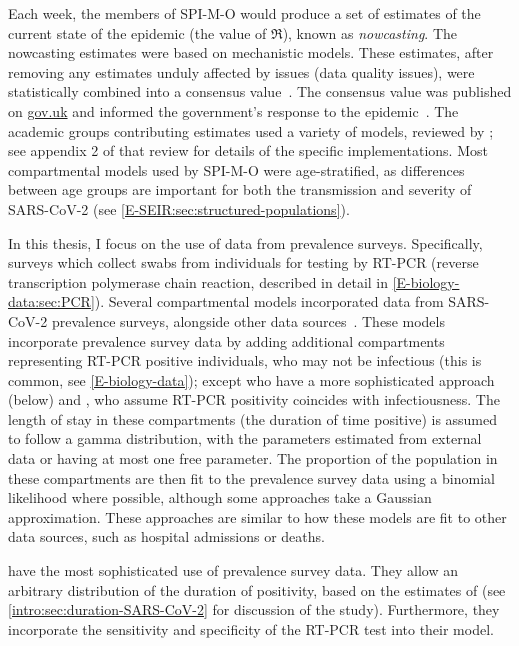 \documentclass[thesis.tex]{subfiles}
\begin{document}
Each week, the members of SPI-M-O would produce a set of estimates of the current state of the epidemic (\eg the value of $\Re$), known as \emph{nowcasting}.
The nowcasting estimates were based on mechanistic models.
These estimates, after removing any estimates unduly affected by issues (\eg data quality issues), were statistically combined into a consensus value~\autocite{parkCombining}.
The consensus value was published on \url{gov.uk} and informed the government's response to the epidemic~\autocite{govRnumber}.
The academic groups contributing estimates used a variety of models, reviewed by \textcite{royalSocietyRnumber}; see appendix 2 of that review for details of the specific implementations.
Most compartmental models used by SPI-M-O were age-stratified, as differences between age groups are important for both the transmission and severity of SARS-CoV-2 (see \cref{E-SEIR:sec:structured-populations}).

In this thesis, I focus on the use of data from prevalence surveys.
Specifically, surveys which collect swabs from individuals for testing by RT-PCR (reverse transcription polymerase chain reaction, described in detail in \cref{E-biology-data:sec:PCR}).
Several compartmental models incorporated data from SARS-CoV-2 prevalence surveys, alongside other data sources~\autocite{daviesAssociation,ironsEstimating,knockKey,nicholsonImproving,pooleyEstimation,birrellRTM2}.
These models incorporate prevalence survey data by adding additional compartments representing RT-PCR positive individuals, who may not be infectious (this is common, see \cref{E-biology-data}); except \textcite{nicholsonImproving} who have a more sophisticated approach (below) and \textcite{ironsEstimating}, who assume RT-PCR positivity coincides with infectiousness.
The length of stay in these compartments (the duration of time positive) is assumed to follow a gamma distribution, with the parameters estimated from external data or having at most one free parameter.
The proportion of the population in these compartments are then fit to the prevalence survey data using a binomial likelihood where possible, although some approaches take a Gaussian approximation.
These approaches are similar to how these models are fit to other data sources, such as hospital admissions or deaths.

\Textcite{nicholsonImproving} have the most sophisticated use of prevalence survey data.
They allow an arbitrary distribution of the duration of positivity, based on the estimates of \textcite{hellewellPCRSensitivity} (see \cref{intro:sec:duration-SARS-CoV-2} for discussion of the \textcite{hellewellPCRSensitivity} study).
Furthermore, they incorporate the sensitivity and specificity of the RT-PCR test into their model.
\end{document}
